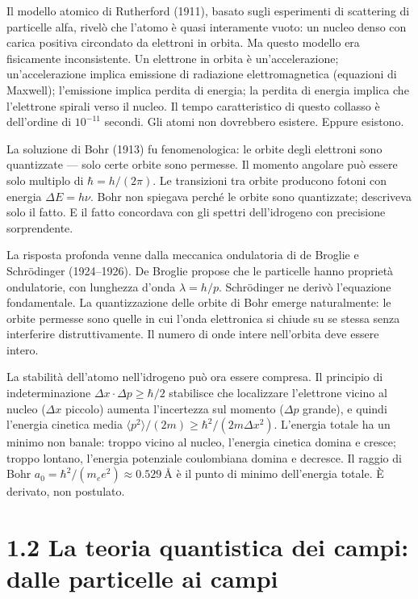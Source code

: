 \documentclass[11.5pt,a4paper,openany]{book}
\theoremstyle{remark}
\begin{document}
Il modello atomico di Rutherford (1911), basato sugli esperimenti di scattering di particelle alfa, rivelò che l'atomo è quasi interamente vuoto: un nucleo denso con carica positiva circondato da elettroni in orbita. Ma questo modello era fisicamente inconsistente. Un elettrone in orbita è un'accelerazione; un'accelerazione implica emissione di radiazione elettromagnetica (equazioni di Maxwell); l'emissione implica perdita di energia; la perdita di energia implica che l'elettrone spirali verso il nucleo. Il tempo caratteristico di questo collasso è dell'ordine di $10^{-11}$ secondi. Gli atomi non dovrebbero esistere. Eppure esistono.

La soluzione di Bohr (1913) fu fenomenologica: le orbite degli elettroni sono quantizzate --- solo certe orbite sono permesse. Il momento angolare può essere solo multiplo di $\hbar = h/(2\pi)$. Le transizioni tra orbite producono fotoni con energia $\Delta E = h\nu$. Bohr non spiegava perché le orbite sono quantizzate; descriveva solo il fatto. E il fatto concordava con gli spettri dell'idrogeno con precisione sorprendente.

La risposta profonda venne dalla meccanica ondulatoria di de Broglie e Schrödinger (1924--1926). De Broglie propose che le particelle hanno proprietà ondulatorie, con lunghezza d'onda $\lambda = h/p$. Schrödinger ne derivò l'equazione fondamentale. La quantizzazione delle orbite di Bohr emerge naturalmente: le orbite permesse sono quelle in cui l'onda elettronica si chiude su se stessa senza interferire distruttivamente. Il numero di onde intere nell'orbita deve essere intero.

La stabilità dell'atomo nell'idrogeno può ora essere compresa. Il principio di indeterminazione $\Delta x \cdot \Delta p \geq \hbar/2$ stabilisce che localizzare l'elettrone vicino al nucleo ($\Delta x$ piccolo) aumenta l'incertezza sul momento ($\Delta p$ grande), e quindi l'energia cinetica media $\langle p^2\rangle/(2m) \geq \hbar^2/(2m\Delta x^2)$. L'energia totale ha un minimo non banale: troppo vicino al nucleo, l'energia cinetica domina e cresce; troppo lontano, l'energia potenziale coulombiana domina e decresce. Il raggio di Bohr $a_0 = \hbar^2/(m_e e^2) \approx 0.529\ \text{\AA}$ è il punto di minimo dell'energia totale. È derivato, non postulato.

\section{1.2 La teoria quantistica dei campi: dalle particelle ai campi}
\end{document}
